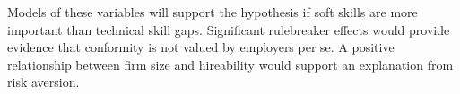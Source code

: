 \documentclass[review]{elsarticle}
\begin{document}

Models of these variables will support the hypothesis if soft skills are more important than technical skill gaps.
Significant rulebreaker effects would provide evidence that conformity is not valued by employers per se.
A positive relationship between firm size and hireability would support an explanation from risk aversion.


\end{document}
